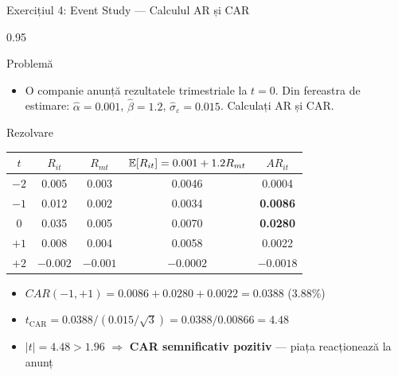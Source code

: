 \documentclass[9pt, aspectratio=169, t]{beamer}
\begin{document}
\begin{frame}{Exercițiul 4: Event Study --- Calculul AR și CAR}
    \begin{cminipage}{0.95\textwidth}
\begin{block}{Problemă}
\begin{itemize}\setlength{\itemsep}{0pt}
    \item O companie anunță rezultatele trimestriale la $t=0$. Din fereastra de estimare: $\hat\alpha = 0.001$, $\hat\beta = 1.2$, $\hat\sigma_\varepsilon = 0.015$. Calculați AR și CAR.
\end{itemize}
\end{block}

\begin{exampleblock}{Rezolvare}
\renewcommand{\arraystretch}{1.1}
\begin{center}
\footnotesize
\begin{tabular}{ccccc}
\toprule
$t$ & $R_{it}$ & $R_{mt}$ & $\mathbb{E}[R_{it}] = 0.001 + 1.2 R_{mt}$ & $AR_{it}$ \\
\midrule
$-2$ & 0.005 & 0.003 & 0.0046 & 0.0004 \\
$-1$ & 0.012 & 0.002 & 0.0034 & \textcolor{Forest}{\textbf{0.0086}} \\
$0$ & 0.035 & 0.005 & 0.0070 & \textcolor{Forest}{\textbf{0.0280}} \\
$+1$ & 0.008 & 0.004 & 0.0058 & 0.0022 \\
$+2$ & $-0.002$ & $-0.001$ & $-0.0002$ & $-0.0018$ \\
\bottomrule
\end{tabular}
\end{center}

\small
\begin{itemize}\setlength{\itemsep}{0pt}
    \item $CAR(-1, +1) = 0.0086 + 0.0280 + 0.0022 = \mathbf{0.0388}$ (3.88\%)
    \item $t_{\text{CAR}} = 0.0388 / (0.015 / \sqrt{3}) = 0.0388 / 0.00866 = \mathbf{4.48}$
    \item $|t| = 4.48 > 1.96$ $\Rightarrow$ \textcolor{Forest}{\textbf{CAR semnificativ pozitiv}} --- piața reacționează la anunț
\end{itemize}
\end{exampleblock}
    \end{cminipage}
\end{frame}
\end{document}
